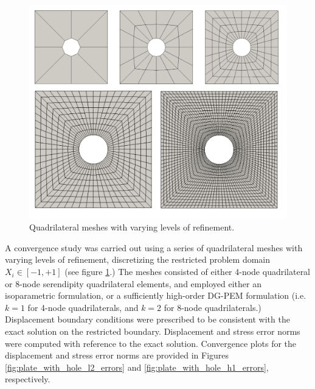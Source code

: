 \begin{figure}[!h]
  \centering
  \includegraphics[width=6.0in]{figures/plate_with_hole_meshes.pdf}
  \caption{Quadrilateral meshes with varying levels of refinement.}
  \label{fig:plate_with_hole_meshes}
\end{figure}

A convergence study was carried out using a series of quadrilateral meshes with varying levels of refinement, discretizing the restricted problem domain $X_i \in [ -1, +1]$ (see figure \ref{fig:plate_with_hole_meshes}.) The meshes consisted of either 4-node quadrilateral or 8-node serendipity quadrilateral elements, and employed either an isoparametric formulation, or a sufficiently high-order DG-PEM formulation (i.e. $k=1$ for 4-node quadrilaterals, and $k=2$ for 8-node quadrilaterals.) Displacement boundary conditions were prescribed to be consistent with the exact solution on the restricted boundary. Displacement and stress error norms were computed with reference to the exact solution. Convergence plots for the displacement and stress error norms are provided in Figures \ref{fig:plate_with_hole_l2_errors} and \ref{fig:plate_with_hole_h1_errors}, respectively.

